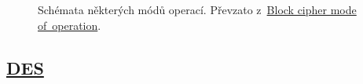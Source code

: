 \begin{figure}[ht]
	\centering
	\\
	\\

	\caption*{Schémata některých módů operací. Převzato z~\href{https://en.wikipedia.org/wiki/Block_cipher_mode_of_operation}{Block cipher mode of~operation}.}
\end{figure}

\subsection{\href{https://en.wikipedia.org/wiki/Data_Encryption_Standard}{DES}}

